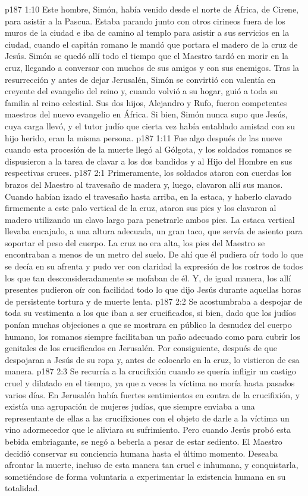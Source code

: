 \vs p187 1:10 \pc Este hombre, Simón, había venido desde el norte de África, de Cirene, para asistir a la Pascua. Estaba parando junto con otros cirineos fuera de los muros de la ciudad e iba de camino al templo para asistir a sus servicios en la ciudad, cuando el capitán romano le mandó que portara el madero de la cruz de Jesús. Simón se quedó allí todo el tiempo que el Maestro tardó en morir en la cruz, llegando a conversar con muchos de sus amigos y con sus enemigos. Tras la resurrección y antes de dejar Jerusalén, Simón se convirtió con valentía en creyente del evangelio del reino y, cuando volvió a su hogar, guió a toda su familia al reino celestial. Sus dos hijos, Alejandro y Rufo, fueron competentes maestros del nuevo evangelio en África. Si bien, Simón nunca supo que Jesús, cuya carga llevó, y el tutor judío que cierta vez había entablado amistad con su hijo herido, eran la misma persona.
\vs p187 1:11 \pc Fue algo después de las nueve cuando esta procesión de la muerte llegó al Gólgota, y los soldados romanos se dispusieron a la tarea de clavar a los dos bandidos y al Hijo del Hombre en sus respectivas cruces.
\vs p187 2:1 Primeramente, los soldados ataron con cuerdas los brazos del Maestro al travesaño de madera y, luego, clavaron allí sus manos. Cuando habían izado el travesaño hasta arriba, en la estaca, y haberlo clavado firmemente a este palo vertical de la cruz, ataron sus pies y los clavaron al madero utilizando un clavo largo para penetrarle ambos pies. La estaca vertical llevaba encajado, a una altura adecuada, un gran taco, que servía de asiento para soportar el peso del cuerpo. La cruz no era alta, los pies del Maestro se encontraban a menos de un metro del suelo. De ahí que él pudiera oír todo lo que se decía en su afrenta y pudo ver con claridad la expresión de los rostros de todos los que tan desconsideradamente se mofaban de él. Y, de igual manera, los allí presentes pudieron oír con facilidad todo lo que dijo Jesús durante aquellas horas de persistente tortura y de muerte lenta.
\vs p187 2:2 Se acostumbraba a despojar de toda su vestimenta a los que iban a ser crucificados, si bien, dado que los judíos ponían muchas objeciones a que se mostrara en público la desnudez del cuerpo humano, los romanos siempre facilitaban un paño adecuado como para cubrir los genitales de los crucificados en Jerusalén. Por consiguiente, después de que despojaran a Jesús de su ropa y, antes de colocarlo en la cruz, lo vistieron de esa manera.
\vs p187 2:3 Se recurría a la crucifixión cuando se quería infligir un castigo cruel y dilatado en el tiempo, ya que a veces la víctima no moría hasta pasados varios días. En Jerusalén había fuertes sentimientos en contra de la crucifixión, y existía una agrupación de mujeres judías, que siempre enviaba a una representante de ellas a las crucifixiones con el objeto de darle a la víctima un vino adormecedor que le aliviara su sufrimiento. Pero cuando Jesús probó esta bebida embriagante, se negó a beberla a pesar de estar sediento. El Maestro decidió conservar su conciencia humana hasta el último momento. Deseaba afrontar la muerte, incluso de esta manera tan cruel e inhumana, y conquistarla, sometiéndose de forma voluntaria a experimentar la existencia humana en su totalidad.
